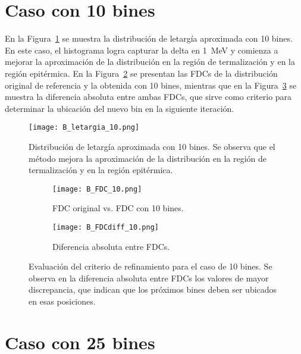 \section*{Caso con 10 bines}

En la Figura~\ref{fig:B_letargia_10} se muestra la distribución de letargía aproximada con 10 bines. En este caso, el histograma logra capturar la delta en 1~MeV y comienza a mejorar la aproximación de la distribución en la región de termalización y en la región epitérmica. En la Figura~\ref{fig:B_FDC_10} se presentan las FDCs de la distribución original de referencia y la obtenida con 10 bines, mientras que en la Figura~\ref{fig:B_FDCdiff_10} se muestra la diferencia absoluta entre ambas FDCs, que sirve como criterio para determinar la ubicación del nuevo bin en la siguiente iteración.

\begin{figure}[H]
    \centering
    \texttt{[image: B\_letargia\_10.png]}
    \caption{Distribución de letargía aproximada con 10 bines. Se observa que el método mejora la aproximación de la distribución en la región de termalización y en la región epitérmica.}
    \label{fig:B_letargia_10}
\end{figure}

\begin{figure}[H]
    \centering
    \begin{subfigure}[b]{0.46\textwidth}
        \texttt{[image: B\_FDC\_10.png]}
        \caption{FDC original vs. FDC con 10 bines.}
        \label{fig:B_FDC_10}
    \end{subfigure}
    \hfill
    \begin{subfigure}[b]{0.46\textwidth}
        \texttt{[image: B\_FDCdiff\_10.png]}
        \caption{Diferencia absoluta entre FDCs.}
        \label{fig:B_FDCdiff_10}
    \end{subfigure}
    \caption{Evaluación del criterio de refinamiento para el caso de 10 bines. Se observa en la diferencia absoluta entre FDCs los valores de mayor discrepancia, que indican que los próximos bines deben ser ubicados en esas posiciones.}
    \label{fig:B_FDC_10_10}
\end{figure}

\section*{Caso con 25 bines}

